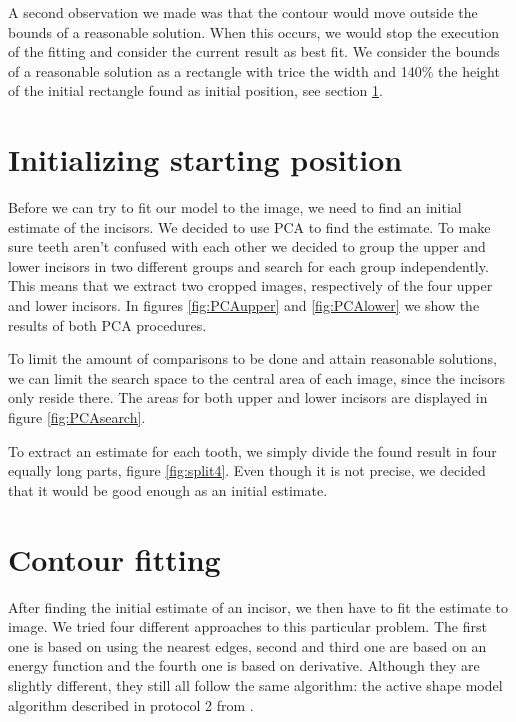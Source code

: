 \documentclass[a4paper,10pt]{article}
\begin{document}
A second observation we made was that the contour would move outside the bounds of a reasonable solution. When this occurs, we would stop the execution of the fitting and consider the current result as best fit. We consider the bounds of a reasonable solution as a rectangle with trice the width and 140\% the height of the initial rectangle found as initial position, see section \ref{sec:initial}.


\section{Initializing starting position}\label{sec:initial}
Before we can try to fit our model to the image, we need to find an initial estimate of the incisors. We decided to use PCA to find the estimate.
To make sure teeth aren't confused with each other we decided to group the upper and lower incisors in two different groups and search for each group independently. This means that we extract two cropped images, respectively of the four upper and lower incisors. In figures \ref{fig:PCAupper} and \ref{fig:PCAlower} we show the results of both PCA procedures.

To limit the amount of comparisons to be done and attain reasonable solutions, we can limit the search space to the central area of each image, since the incisors only reside there. The areas for both upper and lower incisors are displayed in figure \ref{fig:PCAsearch}.

To extract an estimate for each tooth, we simply divide the found result in four equally long parts, figure \ref{fig:split4}. Even though it is not precise, we decided that it would be good enough as an initial estimate.

\section{Contour fitting}\label{sec:fit}
After finding the initial estimate of an incisor, we then have to fit the estimate to image. We tried four different approaches to this particular problem. The first one is based on using the nearest edges, second and third one are based on an energy function and the fourth one is based on derivative. Although they are slightly different, they still all follow the same algorithm: the active shape model algorithm described in protocol 2 from \cite{TemplateAlgorithm}.
\end{document}
